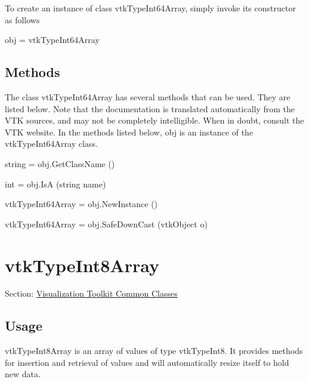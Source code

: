 To create an instance of class vtk\-Type\-Int64\-Array, simply invoke its constructor as follows \begin{DoxyVerb}  obj = vtkTypeInt64Array
\end{DoxyVerb}
 \hypertarget{vtkwidgets_vtkxyplotwidget_Methods}{}\subsection{Methods}\label{vtkwidgets_vtkxyplotwidget_Methods}
The class vtk\-Type\-Int64\-Array has several methods that can be used. They are listed below. Note that the documentation is translated automatically from the V\-T\-K sources, and may not be completely intelligible. When in doubt, consult the V\-T\-K website. In the methods listed below, {\ttfamily obj} is an instance of the vtk\-Type\-Int64\-Array class. 
\begin{DoxyItemize}
\item {\ttfamily string = obj.\-Get\-Class\-Name ()}  
\item {\ttfamily int = obj.\-Is\-A (string name)}  
\item {\ttfamily vtk\-Type\-Int64\-Array = obj.\-New\-Instance ()}  
\item {\ttfamily vtk\-Type\-Int64\-Array = obj.\-Safe\-Down\-Cast (vtk\-Object o)}  
\end{DoxyItemize}\hypertarget{vtkcommon_vtktypeint8array}{}\section{vtk\-Type\-Int8\-Array}\label{vtkcommon_vtktypeint8array}
Section\-: \hyperlink{sec_vtkcommon}{Visualization Toolkit Common Classes} \hypertarget{vtkwidgets_vtkxyplotwidget_Usage}{}\subsection{Usage}\label{vtkwidgets_vtkxyplotwidget_Usage}
vtk\-Type\-Int8\-Array is an array of values of type vtk\-Type\-Int8. It provides methods for insertion and retrieval of values and will automatically resize itself to hold new data.

